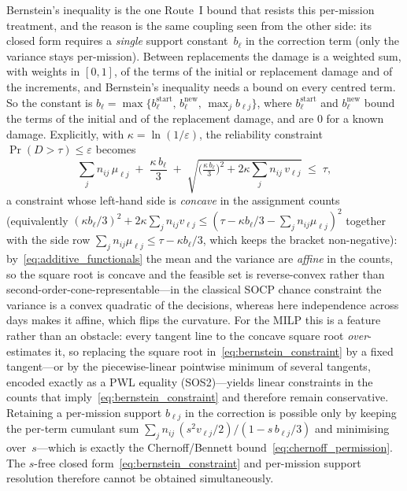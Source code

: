 \documentclass[11pt,a4paper]{article}
\theoremstyle{plain}
\theoremstyle{definition}
\theoremstyle{remark}
\begin{document}
Bernstein's inequality is the one Route~I bound that resists this per-mission treatment, and the reason is the same coupling seen from the other side: its closed form requires a \emph{single} support constant~$b_\ell$ in the correction term (only the variance stays per-mission).
Between replacements the damage is a weighted sum, with weights in $[0,1]$, of the terms of the initial or replacement damage and of the increments, and Bernstein's inequality needs a bound on every centred term.
So the constant is $b_\ell = \max\{b^{\mathrm{start}}_\ell,\, b^{\mathrm{new}}_\ell,\, \max_j b_{\ell j}\}$, where $b^{\mathrm{start}}_\ell$ and $b^{\mathrm{new}}_\ell$ bound the terms of the initial and of the replacement damage, and are $0$ for a known damage.
Explicitly, with $\kappa = \ln(1/\varepsilon)$, the reliability constraint $\Pr(D > \tau) \le \varepsilon$ becomes
\begin{equation}\label{eq:bernstein_constraint}
  \sum_j n_{ij}\,\mu_{\ell j}
  \;+\; \frac{\kappa\, b_\ell}{3}
  \;+\; \sqrt{ \Big( \tfrac{\kappa\, b_\ell}{3} \Big)^2 + 2\kappa \sum_j n_{ij}\, v_{\ell j} }
  \;\le\; \tau,
\end{equation}
a constraint whose left-hand side is \emph{concave} in the assignment counts (equivalently $(\kappa b_\ell/3)^2 + 2\kappa\sum_j n_{ij} v_{\ell j} \le (\tau - \kappa b_\ell/3 - \sum_j n_{ij}\mu_{\ell j})^2$ together with the side row $\sum_j n_{ij}\mu_{\ell j} \le \tau - \kappa b_\ell/3$, which keeps the bracket non-negative): by~\eqref{eq:additive_functionals} the mean and the variance are \emph{affine} in the counts, so the square root is concave and the feasible set is reverse-convex rather than second-order-cone-representable---in the classical SOCP chance constraint the variance is a convex quadratic of the decisions, whereas here independence across days makes it affine, which flips the curvature.
For the MILP this is a feature rather than an obstacle: every tangent line to the concave square root \emph{over}-estimates it, so replacing the square root in~\eqref{eq:bernstein_constraint} by a fixed tangent---or by the piecewise-linear pointwise minimum of several tangents, encoded exactly as a PWL equality (SOS2)---yields linear constraints in the counts that imply~\eqref{eq:bernstein_constraint} and therefore remain conservative.
Retaining a per-mission support $b_{\ell j}$ in the correction is possible only by keeping the per-term cumulant sum $\sum_j n_{ij}\,(s^2 v_{\ell j}/2)/(1 - s\,b_{\ell j}/3)$ and minimising over~$s$---which is exactly the Chernoff/Bennett bound~\eqref{eq:chernoff_permission}.
The $s$-free closed form~\eqref{eq:bernstein_constraint} and per-mission support resolution therefore cannot be obtained simultaneously.
\end{document}
